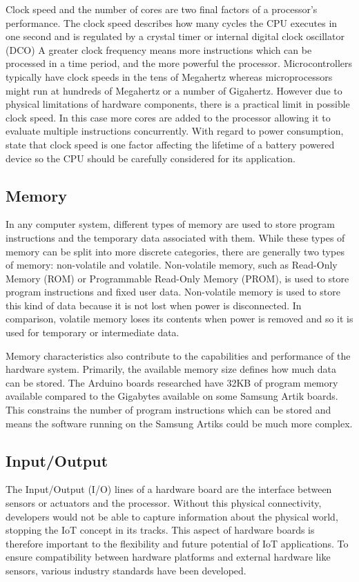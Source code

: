       Clock speed and the number of cores are two final factors of a processor's performance. The clock speed describes how many cycles the CPU executes in one second and is regulated by a crystal timer or internal digital clock oscillator (DCO) A greater clock frequency means more instructions which can be processed in a time period, and the more powerful the processor. Microcontrollers typically have clock speeds in the tens of Megahertz whereas microprocessors might run at hundreds of Megahertz or a number of Gigahertz. However due to physical limitations of hardware components, there is a practical limit in possible clock speed. In this case more cores are added to the processor allowing it to evaluate multiple instructions concurrently. With regard to power consumption, \citet{wsnpower:2010} state that clock speed is one factor affecting the lifetime of a battery powered device so the CPU should be carefully considered for its application.

    \subsection{Memory}
      In any computer system, different types of memory are used to store program instructions and the temporary data associated with them. While these types of memory can be split into more discrete categories, there are generally two types of memory: non-volatile and volatile. Non-volatile memory, such as Read-Only Memory (ROM) or Programmable Read-Only Memory (PROM), is used to store program instructions and fixed user data. Non-volatile memory is used to store this kind of data because it is not lost when power is disconnected. In comparison, volatile memory loses its contents when power is removed and so it is used for temporary or intermediate data.

      Memory characteristics also contribute to the capabilities and performance of the hardware system. Primarily, the available memory size defines how much data can be stored. The Arduino boards researched have 32KB of program memory available compared to the Gigabytes available on some Samsung Artik boards. This constrains the number of program instructions which can be stored and means the software running on the Samsung Artiks could be much more complex.

    \subsection{Input/Output}
    \label{section:io}
      The Input/Output (I/O) lines of a hardware board are the interface between sensors or actuators and the processor. Without this physical connectivity, developers would not be able to capture information about the physical world, stopping the IoT concept in its tracks. This aspect of hardware boards is therefore important to the flexibility and future potential of IoT applications. To ensure compatibility between hardware platforms and external hardware like sensors, various industry standards have been developed.

